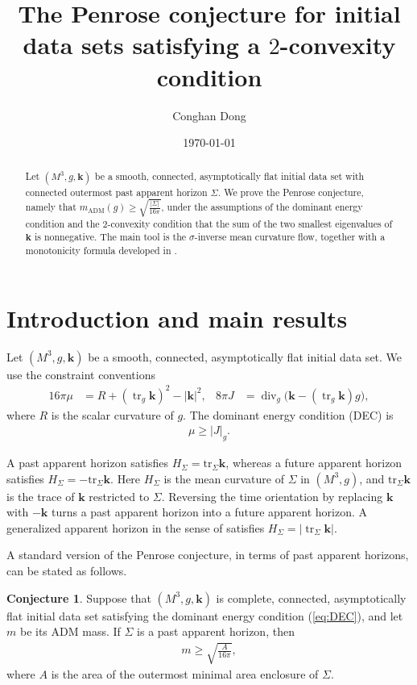 \documentclass[11pt,letterpaper]{amsart}
\title[Penrose conjecture under $2$-convexity condition]
{The Penrose conjecture for initial data sets satisfying a $2$-convexity condition}
\author{Conghan Dong}
\date{\today}
\theoremstyle{definition}
\newtheorem{conj}[thm]{Conjecture}
\theoremstyle{remark}
\newcommand{\tr}{\operatorname{tr}}
\newcommand{\diver}{\operatorname{div}}
\newcommand{\kten}{\mathbf k}
\begin{document}
\begin{abstract}
	Let $(M^3, g, \mathbf{k})$ be a smooth, connected, asymptotically flat initial data set with connected outermost past apparent horizon $\Sigma $. We prove the Penrose conjecture, namely that $m_{\mathrm{ADM}}(g) \geq \sqrt{\frac{|\Sigma |}{16 \pi }} $, under the assumptions of the dominant energy condition and the $2$-convexity condition that the sum of the two smallest eigenvalues of $\kten$ is nonnegative. The main tool is the $\sigma $-inverse mean curvature flow, together with a monotonicity formula developed in \cite{Dong26SigmaIMCF}.
\end{abstract}

\maketitle 

\section{Introduction and main results}

Let \((M^3,g,\kten)\) be a smooth, connected, asymptotically flat initial data set.  We use the constraint
conventions
\begin{align}\label{eq:constraints}
  16\pi\mu
  &=R+(\tr_g\kten)^2-|\kten|^2,
  &
  8\pi J
  &=\diver_g\big(\kten-(\tr_g\kten)g\big),
\end{align}
where \(R\) is the scalar curvature of \(g\).  The dominant energy condition
(DEC) is
\begin{align}\label{eq:DEC}
  \mu\geq |J|_g.
\end{align}

A past apparent horizon satisfies $H_{\Sigma } = \mathrm{tr}_{\Sigma } \mathbf{k}$, whereas a future apparent horizon satisfies $H_{\Sigma } = - \mathrm{tr}_{\Sigma } \kten$. Here $H_{\Sigma }$ is the mean curvature of $\Sigma $ in $(M^3, g)$, and $\mathrm{tr}_{\Sigma } \kten$ is the trace of $\kten$ restricted to $\Sigma $. Reversing the time orientation by replacing $\kten$ with $- \kten$ turns
 a past apparent horizon into a future apparent horizon. A generalized apparent horizon in the sense of
\cite{BrayKhuri11} satisfies
 $H_{\Sigma }=|\tr_\Sigma\kten|.$

A standard version of the Penrose conjecture, in terms of past apparent horizons, can be stated as follows.

\begin{conj}
	Suppose that $(M^3, g, \kten)$ is complete, connected, asymptotically flat initial data set satisfying the dominant energy condition (\ref{eq:DEC}), and let $m$ be its ADM mass. If $\Sigma $ is a past apparent horizon, then
	\begin{align*}
		m \geq \sqrt{\frac{A}{16 \pi }} ,
	\end{align*} 
	where $A$ is the area of the outermost minimal area enclosure of $\Sigma $. 
\end{conj}
\end{document}
